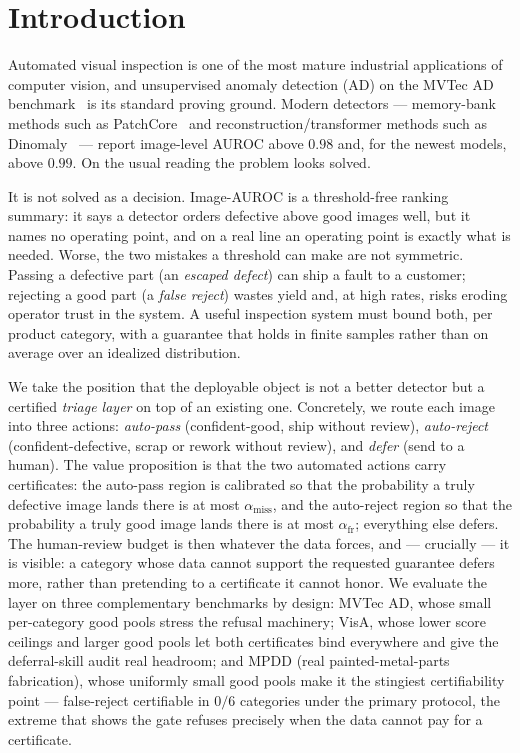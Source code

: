 \documentclass[11pt]{article}
\begin{document}
\section{Introduction}
\label{sec:intro}

Automated visual inspection is one of the most mature industrial applications of computer vision,
and unsupervised anomaly detection (AD) on the MVTec AD benchmark~\citep{bergmann2019mvtec} is its
standard proving ground. Modern detectors --- memory-bank methods such as
PatchCore~\citep{roth2022patchcore} and reconstruction/transformer methods such as
Dinomaly~\citep{guo2025dinomaly} --- report image-level AUROC above $0.98$ and, for the newest
models, above $0.99$. On the usual reading the problem looks solved.

It is not solved as a decision. Image-AUROC is a threshold-free ranking summary: it says a
detector orders defective above good images well, but it names no operating point, and on a real
line an operating point is exactly what is needed. Worse, the two mistakes a threshold can make
are not symmetric. Passing a defective part (an \emph{escaped defect}) can ship a fault to a
customer; rejecting a good part (a \emph{false reject}) wastes yield and, at high rates, risks
eroding operator trust in the system. A useful inspection system must bound both, per
product category, with a guarantee that holds in finite samples rather than on average over an
idealized distribution.

We take the position that the deployable object is not a better detector but a certified
\emph{triage layer} on top of an existing one. Concretely, we route each image into three actions:
\emph{auto-pass} (confident-good, ship without review), \emph{auto-reject} (confident-defective,
scrap or rework without review), and \emph{defer} (send to a human). The value proposition is that
the two automated actions carry certificates: the auto-pass region is calibrated so that the
probability a truly defective image lands there is at most $\alpha_{\text{miss}}$, and the
auto-reject region so that the probability a truly good image lands there is at most
$\alpha_{\text{fr}}$; everything else defers. The human-review budget is then whatever the data
forces, and --- crucially --- it is visible: a category whose data cannot support the
requested guarantee defers more, rather than pretending to a certificate it cannot honor.
We evaluate the layer on three complementary benchmarks by design: MVTec AD, whose small
per-category good pools stress the refusal machinery; VisA, whose lower score ceilings and
larger good pools let both certificates bind everywhere and give the deferral-skill audit real
headroom; and MPDD (real painted-metal-parts fabrication), whose uniformly small good pools make
it the stingiest certifiability point --- false-reject certifiable in $0/6$ categories under the
primary protocol, the extreme that shows the gate refuses precisely when the data cannot pay for
a certificate.
\end{document}

